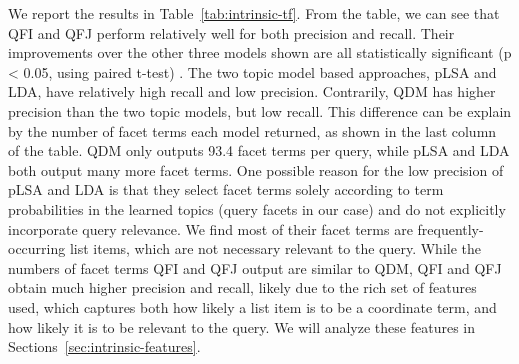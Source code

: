 We report the results in Table~\ref{tab:intrinsic-tf}. From the table, we can see that QFI and QFJ perform relatively well for both precision and recall. Their improvements over the other three models shown are all statistically significant (p < 0.05, using paired t-test) . The two topic model based approaches, pLSA and LDA, have relatively high recall and low precision. Contrarily, QDM has higher precision than the two topic models, but low recall.
This difference can be explain by the number of facet terms each model returned, as shown in the last column of the table. QDM only outputs 93.4 facet terms per query, while pLSA and LDA both output many more facet terms. One possible reason for the low precision of pLSA and LDA is that they select facet terms solely according to term probabilities in the learned topics (query facets in our case) and do not explicitly incorporate query relevance. We find most of their facet terms are frequently-occurring list items, which are not necessary relevant to the query.
While the numbers of facet terms QFI and QFJ output are similar to QDM, QFI and QFJ obtain much higher precision and recall, likely due to the rich set of features used, which captures both how likely a list item is to be a coordinate term, and how likely it is to be relevant to the query. We will analyze these features in Sections~\ref{sec:intrinsic-features}. 

